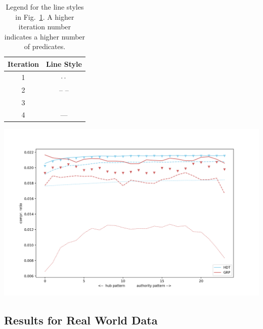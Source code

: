 \begin{table}[ht]
	\begin{minipage}[b]{1\linewidth}
		\centering
		\begin{tabular}{|c|c|}
			\hline 
			Iteration & Line Style \\ 
			\hline 
			1 & $ \cdot \cdot$ \\ 
			\hline 
			2 & -- -- \\ 
			\hline 
			3 & \rotatebox[origin=c]{-180}{$\triangle \triangle$} \\ 
			\hline 
			4 & --- \\ 
			\hline 
		\end{tabular}
		\caption{Legend for the line styles in Fig.~\ref{fig:bothwithoutdictincreasingpreds}. A higher iteration number indicates a higher number of predicates.}
		\label{tab:legend}
	\end{minipage}\hfill
	\begin{minipage}[b]{\linewidth}
		\centering
		\includegraphics[width=\linewidth]{figures/GRPvsHDT/bothWithoutDictIncreasingPreds}
		\label{fig:bothwithoutdictincreasingpreds}
	\end{minipage}
\end{table}

\FloatBarrier
\subsection{Results for Real World Data}

